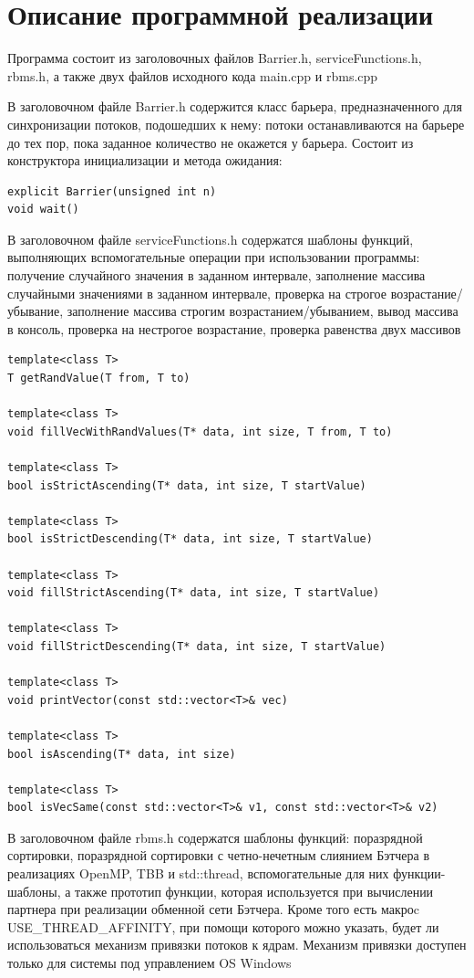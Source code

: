 \documentclass{report}
\begin{document}
\section*{Описание программной реализации}
\par Программа состоит из заголовочных файлов Barrier.h, serviceFunctions.h, rbms.h, а также двух файлов исходного кода main.cpp и rbms.cpp
\par В заголовочном файле Barrier.h содержится класс барьера, предназначенного для синхронизации потоков, подошедших к нему: потоки останавливаются на барьере до тех пор, пока заданное количество не окажется у барьера. Состоит из конструктора инициализации и метода ожидания:
\begin{lstlisting}
explicit Barrier(unsigned int n)
void wait()
\end{lstlisting}
\par В заголовочном файле serviceFunctions.h содержатся шаблоны функций, выполняющих вспомогательные операции при использовании программы: получение случайного значения в заданном интервале, заполнение массива случайными значениями в заданном интервале, проверка на строгое возрастание/убывание, заполнение массива строгим возрастанием/убыванием, вывод массива в консоль, проверка на нестрогое возрастание, проверка равенства двух массивов
\begin{lstlisting}
template<class T>
T getRandValue(T from, T to)

template<class T>
void fillVecWithRandValues(T* data, int size, T from, T to)

template<class T>
bool isStrictAscending(T* data, int size, T startValue)

template<class T>
bool isStrictDescending(T* data, int size, T startValue)

template<class T>
void fillStrictAscending(T* data, int size, T startValue)

template<class T>
void fillStrictDescending(T* data, int size, T startValue)

template<class T>
void printVector(const std::vector<T>& vec)

template<class T>
bool isAscending(T* data, int size)

template<class T>
bool isVecSame(const std::vector<T>& v1, const std::vector<T>& v2)
\end{lstlisting}
\par В заголовочном файле rbms.h содержатся шаблоны функций: поразрядной сортировки, поразрядной сортировки с четно-нечетным слиянием Бэтчера в реализациях OpenMP, TBB и std::thread, вспомогательные для них функции-шаблоны, а также прототип функции, которая используется при вычислении партнера при реализации обменной сети Бэтчера. Кроме того есть макроc USE\_THREAD\_AFFINITY, при помощи которого можно указать, будет ли использоваться механизм привязки потоков к ядрам. Механизм привязки доступен только для системы под управлением OS Windows
\end{document}
